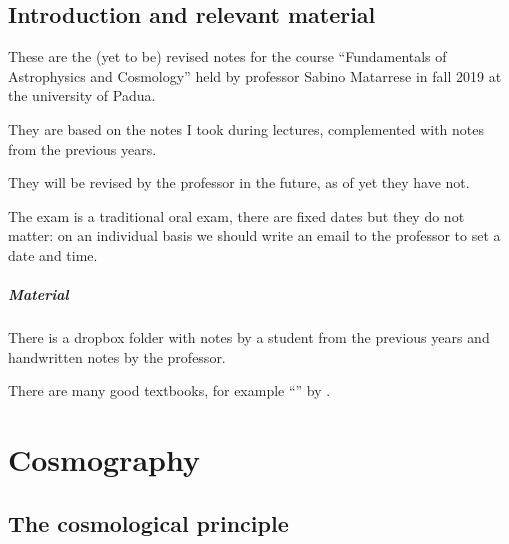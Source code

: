 \documentclass[main.tex]{subfiles}
\begin{document}
\section*{Introduction and relevant material}

These are the
(yet to be)
revised notes for the course ``Fundamentals of Astrophysics and Cosmology'' held by professor Sabino Matarrese in fall 2019 at the university of Padua.

They are based on the notes I took during lectures, complemented with notes from the previous years.

They will be revised by the professor in the future, as of yet they have not.

The exam is a traditional oral exam, there are fixed dates but they do not matter: on an individual basis we should write an email to the professor to set a date and time.

\paragraph{Material}

There is a dropbox folder with notes by a student from the previous years \cite[]{Pacciani:2018} and handwritten notes by the professor.

There are many good textbooks, for example ``'' by \citeauthor{LucchinColes:2002} \cite[]{LucchinColes:2002}.





\chapter{Cosmography}


\section{The cosmological principle}
\end{document}
